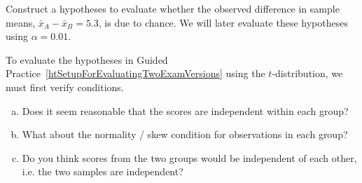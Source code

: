 \begin{exercisewrap}
\begin{nexercise}
\label{htSetupForEvaluatingTwoExamVersions}%
Construct a hypotheses to evaluate whether the observed
difference in sample means, $\bar{x}_A - \bar{x}_B=5.3$,
is due to chance. We will later evaluate these hypotheses
using $\alpha = 0.01$.\footnotemark{}
\end{nexercise}
\end{exercisewrap}

\begin{exercisewrap}
\begin{nexercise} \label{conditionsForTDistForEvaluatingTwoExamVersions}%
To evaluate the hypotheses in Guided Practice~\ref{htSetupForEvaluatingTwoExamVersions} using the $t$-distribution, we must first verify conditions.\footnotemark{}
\begin{enumerate}[(a)]
\setlength{\itemsep}{0mm}
\item
    Does it seem reasonable that the scores are independent
    within each group?
\item
    What about the normality / skew condition for observations
    in each group?
\item
    Do you think scores from the two groups would be independent
    of each other, i.e. the two samples are
    independent?
\end{enumerate}
\end{nexercise}
\end{exercisewrap}

